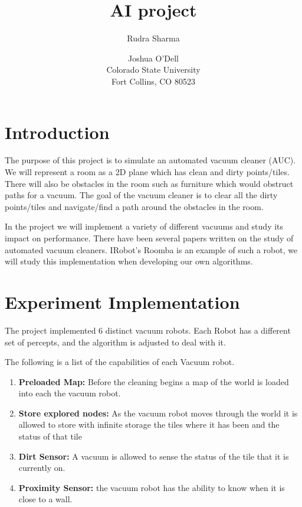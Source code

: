 \documentclass[letterpaper]{article}
\title{AI project}
\author{Rudra Sharma \and Joshua O'Dell \\ Colorado State University \\ Fort Collins, CO 80523 }
\begin{document}
\maketitle

\section{Introduction}

The purpose of this project is to simulate an automated vacuum cleaner (AUC). We will represent a room as a 2D plane which has clean and dirty points/tiles. There will also be obstacles in the room such as furniture which would obstruct paths for a vacuum. The goal of the vacuum cleaner is to clear all the dirty points/tiles and navigate/find a path around the obstacles in the room.

In the project we will implement a variety of different vacuums and study its impact on performance. There have been several papers written on the study of automated vacuum cleaners. IRobot’s Roomba is an example of such a robot, we will study this implementation when developing our own algorithms.

\section{Experiment Implementation}

The project implemented 6 distinct vacuum robots. Each Robot has a different set of percepts, and the algorithm is adjusted to deal with it.

The following is a list of the capabilities of each Vacuum robot.
\begin{enumerate}  
\item \textbf{Preloaded Map:} Before the cleaning begins a map of the world is loaded into each the vacuum robot.
\item \textbf{Store explored nodes:} As the vacuum robot moves through the world it is allowed to store with infinite storage the tiles where it has been and the status of that tile
\item \textbf{Dirt Sensor:} A vacuum is allowed to sense the status of the tile that it is currently on.
\item \textbf{Proximity Sensor:} the vacuum robot has the ability to know when it is close to a wall.
\end{enumerate}  
\end{document}
